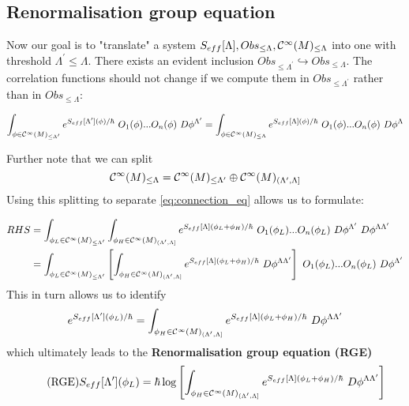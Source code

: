 \subsection{Renormalisation group equation}
\label{subsec:renorm_group_eq}

Now our goal is to "translate" a system $S_{eff}[\Lambda], Obs_{\leq \Lambda}, \mathcal{C}^{\infty}(M)_{\leq \Lambda}$ into one with threshold $\Lambda^\prime \leq \Lambda$. There exists an evident inclusion $Obs_{\leq \Lambda^\prime} \hookrightarrow Obs_{\leq \Lambda}$. The correlation functions should not change if we compute them in $Obs_{\leq \Lambda^\prime}$ rather than in $Obs_{\leq \Lambda}$:

\begin{align}
\label{eq:connection_eq}
  \int_{\phi \in \Ci(M)_{\leq \Lambda^\prime}} e^{S_{eff}[\Lambda^\prime] (\phi) / \hbar} \ O_1(\phi) ... O_n(\phi) \ D\phi^{\Lambda^\prime} = \int_{\phi \in \Ci(M)_{\leq \Lambda}} e^{S_{eff}[\Lambda] (\phi) / \hbar} \ O_1(\phi) ... O_n(\phi) \ D\phi^{\Lambda}
\end{align}

Further note that we can split
$$ \mathcal{C}^{\infty}(M)_{\leq \Lambda} = \mathcal{C}^{\infty}(M)_{\leq \Lambda^\prime} \oplus \mathcal{C}^{\infty}(M)_{(\Lambda^\prime,\Lambda]} $$
Using this splitting to separate \eqref{eq:connection_eq} allows us to formulate:

\begin{align}
  RHS &= \int_{\phi_L \in \Ci(M)_{\leq \Lambda^\prime}}
  \int_{\phi_H \in \Ci(M)_{(\Lambda^\prime,\Lambda]}}
  e^{S_{eff}[\Lambda] (\phi_L + \phi_H) / \hbar} \ O_1(\phi_L) ... O_n(\phi_L) \ D\phi^{\Lambda^\prime} \ D\phi^{\Lambda \Lambda^\prime} \\
  &= \int_{\phi_L \in \Ci(M)_{\leq \Lambda^\prime}}
  \left [\int_{\phi_H \in \Ci(M)_{(\Lambda^\prime,\Lambda]}}
  e^{S_{eff}[\Lambda] (\phi_L + \phi_H) / \hbar} \ D\phi^{\Lambda \Lambda^\prime} \right] \ O_1(\phi_L) ... O_n(\phi_L) \ D\phi^{\Lambda^\prime} \\
\end{align}
This in turn allows us to identify
$$ e^{S_{eff}[\Lambda^\prime](\phi_L)/\hbar}
= \int_{\phi_H \in \Ci(M)_{(\Lambda^\prime,\Lambda]}}
e^{S_{eff}[\Lambda] (\phi_L + \phi_H) / \hbar} \ D\phi^{\Lambda \Lambda^\prime} $$
which ultimately leads to the \textbf{Renormalisation group equation (RGE)}
\begin{align}
\label{eq:RGE}\tag{RGE}
  S_{eff}[\Lambda^\prime](\phi_L)
  = \hbar \log \left[ \int_{\phi_H \in \Ci(M)_{(\Lambda^\prime,\Lambda]}}
  e^{S_{eff}[\Lambda] (\phi_L + \phi_H) / \hbar} \ D\phi^{\Lambda \Lambda^\prime} \right]
\end{align}


